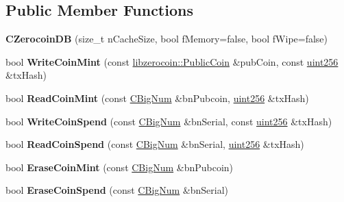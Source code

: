 \subsection*{Public Member Functions}
\begin{DoxyCompactItemize}
\item 
\mbox{\label{class_c_zerocoin_d_b_ac955b184e894c817500fc11db0ec2670}} 
{\bfseries C\+Zerocoin\+DB} (size\+\_\+t n\+Cache\+Size, bool f\+Memory=false, bool f\+Wipe=false)
\item 
\mbox{\label{class_c_zerocoin_d_b_a58b78fd953536c0ad59e5193bcffabe7}} 
bool {\bfseries Write\+Coin\+Mint} (const \mbox{\hyperlink{classlibzerocoin_1_1_public_coin}{libzerocoin\+::\+Public\+Coin}} \&pub\+Coin, const \mbox{\hyperlink{classuint256}{uint256}} \&tx\+Hash)
\item 
\mbox{\label{class_c_zerocoin_d_b_a90b0f4aecbbbe57b1b9cad6e1c37ec15}} 
bool {\bfseries Read\+Coin\+Mint} (const \mbox{\hyperlink{class_c_big_num}{C\+Big\+Num}} \&bn\+Pubcoin, \mbox{\hyperlink{classuint256}{uint256}} \&tx\+Hash)
\item 
\mbox{\label{class_c_zerocoin_d_b_a8beb2643c918d7493f0fa3f773781b21}} 
bool {\bfseries Write\+Coin\+Spend} (const \mbox{\hyperlink{class_c_big_num}{C\+Big\+Num}} \&bn\+Serial, const \mbox{\hyperlink{classuint256}{uint256}} \&tx\+Hash)
\item 
\mbox{\label{class_c_zerocoin_d_b_abd5c1b53d5ed33d4196010e51e2b8cbb}} 
bool {\bfseries Read\+Coin\+Spend} (const \mbox{\hyperlink{class_c_big_num}{C\+Big\+Num}} \&bn\+Serial, \mbox{\hyperlink{classuint256}{uint256}} \&tx\+Hash)
\item 
\mbox{\label{class_c_zerocoin_d_b_acdef7b13610bd8f4ad5f4a3d5b314e33}} 
bool {\bfseries Erase\+Coin\+Mint} (const \mbox{\hyperlink{class_c_big_num}{C\+Big\+Num}} \&bn\+Pubcoin)
\item 
\mbox{\label{class_c_zerocoin_d_b_ae370638a6807897728027a73e46fa090}} 
bool {\bfseries Erase\+Coin\+Spend} (const \mbox{\hyperlink{class_c_big_num}{C\+Big\+Num}} \&bn\+Serial)
\item 
\mbox{\label{class_c_zerocoin_d_b_a189468104c0cbff0c4cf6032f1243acf}} 

\end{DoxyCompactItemize}

